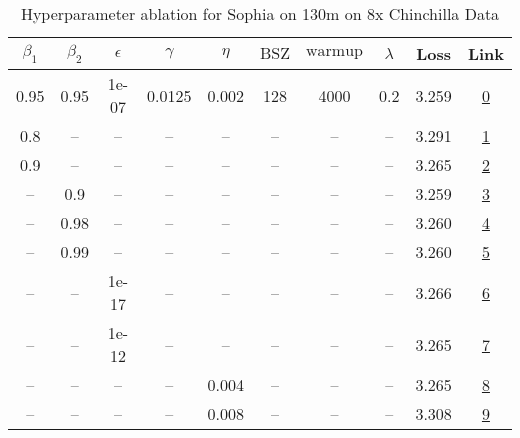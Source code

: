 \begin{table}[H]
\centering
\caption{Hyperparameter ablation for Sophia on 130m on 8x Chinchilla Data}
\label{tab:ablation_sophia_130m_8}
\begin{tabular}{cccccccccc}
\toprule
$\beta_1$ & $\beta_2$ & $\epsilon$ & $\gamma$ & $\eta$ & $\mathrm{BSZ}$ & $\mathrm{warmup}$ & $\lambda$ & Loss & Link \\
\midrule
0.95 & 0.95 & 1e-07 & 0.0125 & 0.002 & 128 & 4000 & 0.2 & 3.259 & \href{https://wandb.ai/stanford-mercury/optimizer-scaling/runs/sweep-130m-21B-sophia8d270alr0.002-wd0.2-minlr0-warmup4000-b10.9-728991}{0} \\
\midrule
0.8 & -- & -- & -- & -- & -- & -- & -- & 3.291 & \href{https://wandb.ai/stanford-mercury/optimizer-scaling/runs/sweep-130m-21B-sophiaaa290clr0.002-wd0.2-minlr0-warmup4000-b10.8-82d393}{1} \\
0.9 & -- & -- & -- & -- & -- & -- & -- & 3.265 & \href{https://wandb.ai/stanford-mercury/optimizer-scaling/runs/sweep-130m-21B-sophia87ebc2lr0.002-wd0.2-minlr0-warmup4000-b10.9-e413d1}{2} \\
-- & 0.9 & -- & -- & -- & -- & -- & -- & 3.259 & \href{https://wandb.ai/stanford-mercury/optimizer-scaling/runs/sweep-130m-21B-sophiaa3b59clr0.002-wd0.2-minlr0-warmup4000-b10.9-c08a34}{3} \\
-- & 0.98 & -- & -- & -- & -- & -- & -- & 3.260 & \href{https://wandb.ai/stanford-mercury/optimizer-scaling/runs/sweep-130m-21B-sophia6c3357lr0.002-wd0.2-minlr0-warmup4000-b10.9-daeacb}{4} \\
-- & 0.99 & -- & -- & -- & -- & -- & -- & 3.260 & \href{https://wandb.ai/stanford-mercury/optimizer-scaling/runs/sweep-130m-21B-sophia38a997lr0.002-wd0.2-minlr0-warmup4000-b10.9-184cfb}{5} \\
-- & -- & 1e-17 & -- & -- & -- & -- & -- & 3.266 & \href{https://wandb.ai/stanford-mercury/optimizer-scaling/runs/sweep-130m-21B-sophia50bc78lr0.002-wd0.2-minlr0-warmup4000-b10.9-206787}{6} \\
-- & -- & 1e-12 & -- & -- & -- & -- & -- & 3.265 & \href{https://wandb.ai/stanford-mercury/optimizer-scaling/runs/sweep-130m-21B-sophia80e81dlr0.002-wd0.2-minlr0-warmup4000-b10.9-43e123}{7} \\
-- & -- & -- & -- & 0.004 & -- & -- & -- & 3.265 & \href{https://wandb.ai/stanford-mercury/optimizer-scaling/runs/sweep-130m-21B-sophia25d3f7lr0.004-wd0.2-minlr0-warmup4000-b10.9-28a07e}{8} \\
-- & -- & -- & -- & 0.008 & -- & -- & -- & 3.308 & \href{https://wandb.ai/stanford-mercury/optimizer-scaling/runs/sweep-130m-21B-sophia6ff3cdlr0.008-wd0.2-minlr0-warmup4000-b10.9-7fae63}{9} \\

\end{tabular}
\end{table}
